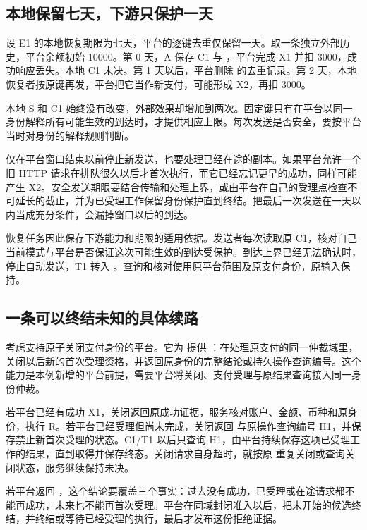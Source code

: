 \subsection*{本地保留七天，下游只保护一天}

设 E1 的本地恢复期限为七天，平台的逐键去重仅保留一天。取一条独立外部历史，平台余额初始 10000。第 0 天，A 保存 C1 与 ，平台完成 X1 并扣 3000，成功响应丢失。本地 C1 未决。第 1 天以后，平台删除  的去重记录。第 2 天，本地恢复者按原键再发，平台把它当作新支付，可能形成 X2，再扣 3000。

本地 S 和 C1 始终没有改变，外部效果却增加到两次。固定键只有在平台以同一身份解释所有可能生效的到达时，才提供相应上限。每次发送是否安全，要按平台当时对身份的解释规则判断。


仅在平台窗口结束以前停止新发送，也要处理已经在途的副本。如果平台允许一个旧 HTTP 请求在排队很久以后才首次执行，而它已经忘记更早的成功，同样可能产生 X2。安全发送期限要结合传输和处理上界，或由平台在自己的受理点检查不可延长的截止，并为已受理工作保留身份保护直到终结。把最后一次发送在一天以内当成充分条件，会漏掉窗口以后的到达。

恢复任务因此保存下游能力和期限的适用依据。发送者每次读取原 C1，核对自己当前模式与平台是否保证这次可能生效的到达受保护。到达上界已经无法确认时，停止自动发送，T1 转入 。查询和核对使用原平台范围及原支付身份，原输入保持。

\subsection*{一条可以终结未知的具体续路}

考虑支持原子关闭支付身份的平台。它为  提供 ：在处理原支付的同一仲裁域里，关闭以后新的首次受理资格，并返回原身份的完整结论或持久操作查询编号。这个能力是本例新增的平台前提，需要平台将关闭、支付受理与原结果查询接入同一身份仲裁。

若平台已经有成功 X1，关闭返回原成功证据，服务核对账户、金额、币种和原身份，执行 R。若平台已经受理但尚未完成，关闭返回  与原操作查询编号 H1，并保存禁止新首次受理的状态。C1/T1 以后只查询 H1，由平台持续保存这项已受理工作的结果，直到取得并保存终态。关闭请求自身超时，就按原  重复关闭或查询关闭状态，服务继续保持未决。

若平台返回 ，这个结论要覆盖三个事实：过去没有成功，已受理或在途请求都不能再成功，未来也不能再首次受理。平台在同域封闭准入以后，把未开始的候选终结，并终结或等待已经受理的执行，最后才发布这份拒绝证据。

